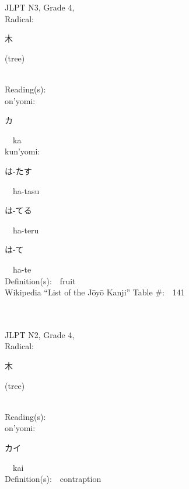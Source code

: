 \begin{multicols}{2}
{JLPT N3, Grade 4, \\Radical:\ \ {\begin{CJK}{UTF8}{min} 木 \end{CJK}} (tree) } \\
Reading(s):\ \ \\
{\hspace*{1em}}on'yomi:\ \ \\
{\hspace*{2em}}{\begin{CJK}{UTF8}{min} カ \end{CJK}}\ \ ka\ \ \\
{\hspace*{1em}}kun'yomi:\ \ \\
{\hspace*{2em}}{\begin{CJK}{UTF8}{min} は-たす \end{CJK}}\ \ ha-tasu\ \ \\
{\hspace*{2em}}{\begin{CJK}{UTF8}{min} は-てる \end{CJK}}\ \ ha-teru\ \ \\
{\hspace*{2em}}{\begin{CJK}{UTF8}{min} は-て \end{CJK}}\ \ ha-te\ \ \\
Definition(s):\ \ fruit \\
Wikipedia ``List of the J\=oy\=o Kanji'' Table \#:\ \ 141 \\
\ \ \\
{\fontsize{34pt}{40pt}  }\ \ \\  %
{JLPT N2, Grade 4, \\Radical:\ \ {\begin{CJK}{UTF8}{min} 木 \end{CJK}} (tree) } \\
Reading(s):\ \ \\
{\hspace*{1em}}on'yomi:\ \ \\
{\hspace*{2em}}{\begin{CJK}{UTF8}{min} カイ \end{CJK}}\ \ kai\ \ \\
Definition(s):\ \ contraption \\

\end{multicols}
